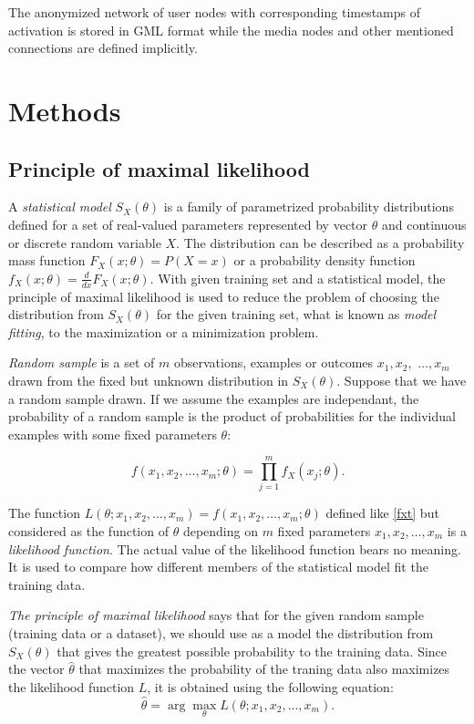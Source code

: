 \documentclass[times, utf8, zavrsni]{fer}
\newcommand{\argmax}{\arg\!\max}
\begin{document}
The anonymized network of user nodes with corresponding timestamps of activation is stored in GML format \cite{gml} while the media nodes and other mentioned connections are defined implicitly.
  
\chapter{Methods}
\section{Principle of maximal likelihood}

A \emph{statistical model} $S_X(\theta)$ is a family of parametrized probability distributions defined for a set of real-valued parameters represented by vector $\theta$ and continuous or discrete random variable $X$. The distribution can be described  as a probability mass function $F_X(x;\theta) = P(X = x)$ or a probability density function $f_X(x;\theta) = \frac{d}{dx}F_X(x;\theta)$. With given training set and a statistical model, the principle of maximal likelihood is used to reduce the problem of choosing the distribution from $S_X(\theta)$ for the given training set, what is known as \emph{model fitting}, to the maximization or a minimization problem.

 \emph{Random sample} is a set of $m$ observations, examples or outcomes $x_1, x_2,$ $\dots, x_m$ drawn from the fixed but unknown distribution in $S_X(\theta)$. Suppose that we have a random sample drawn. If we assume the examples are independant, the probability of a random sample is the product of probabilities for the individual examples with some fixed parameters $\theta$:

\begin{equation}
\label{fxt}
 f(x_1, x_2, \dots, x_m; \theta) = \prod_{j=1}^{m}{f_{X}(x_j; \theta )}. 
\end{equation}

The function $L(\theta; x_1, x_2, \dots, x_m) = f(x_1, x_2, \dots, x_m; \theta)$ defined like \eqref{fxt} but considered as the function of $\theta$ depending on $m$ fixed parameters $x_1, x_2, \dots, x_m$ is a \emph{likelihood function}. The actual value of the likelihood function bears no meaning. It is used to compare how different members of the statistical model fit the training data. 

\emph{The principle of maximal likelihood} says that for the given random sample (training data or a dataset), we should use as a model the distribution from $S_X(\theta)$ that gives the greatest possible probability to the training data. Since the vector $\hat\theta$ that maximizes the probability of the traning data also maximizes the likelihood function $L$, it is obtained using the following equation:
\begin{equation}
\label{MLE}
 \hat\theta = \argmax_{\theta} L(\theta; x_1, x_2, \dots, x_m).
\end{equation}
\end{document}
